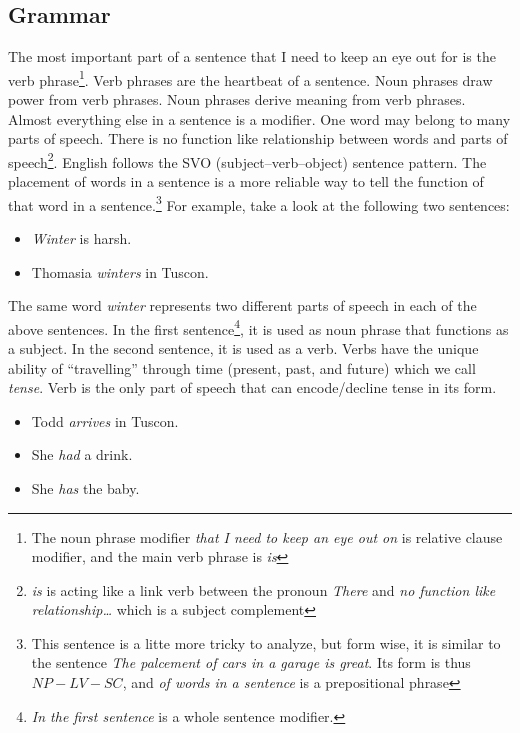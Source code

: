\documentclass[a4paper]{article}
\begin{document}
\subsection*{Grammar}
The most important part of a sentence that I need to keep an eye out for is the verb phrase\footnote{The noun phrase modifier
    \emph{that I need to keep an eye out on} is relative clause modifier, and the main verb phrase is \emph{is}}. Verb phrases are 
the heartbeat of a sentence. Noun phrases draw power from verb phrases. Noun phrases derive meaning from verb phrases. Almost 
everything else in a sentence is a modifier. One word may belong to many parts of speech. There is no function like relationship 
between words and parts of speech\footnote{\emph{is} is acting like a link verb between the pronoun \emph{There} and \emph{no function
        like relationship\ldots} which is a subject complement}. English follows the SVO (subject--verb--object) sentence pattern. 
The placement of words in a sentence is a more reliable way to tell the function of that word in a sentence.\footnote{This sentence is a
    litte more tricky to analyze, but form wise, it is similar to the sentence \emph{The palcement of cars in a garage is great}. Its form
    is thus \(NP-LV-SC\), and \emph{of words in a sentence} is a prepositional phrase} For example, take a look at the following two 
sentences:


\begin{itemize}
    \item \emph{Winter} is harsh.
    \item Thomasia \emph{winters} in Tuscon.
\end{itemize}

The same word \emph{winter} represents two different parts of speech in each of the above sentences. In the first sentence\footnote{
    \emph{In the first sentence} is a whole sentence modifier.}, it is used as noun phrase that functions as a subject. In the 
second sentence, it is used as a verb. Verbs have the unique ability of ``travelling'' through time (present, past, and future) which we 
call \emph{tense}. Verb is the only part of speech that can encode/decline tense in its form.

\begin{itemize}
    \item Todd \emph{arrives} in Tuscon.
    \item She \emph{had} a drink.
    \item She \emph{has} the baby.
\end{itemize}
\end{document}

